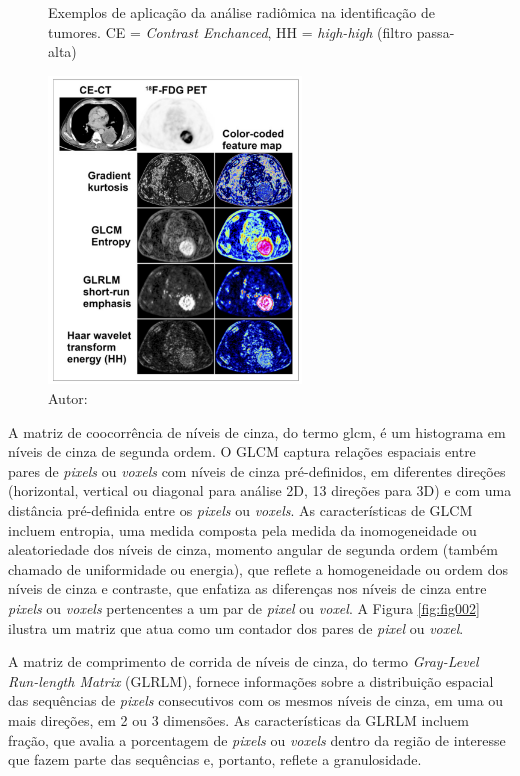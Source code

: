 \begin{figure}[htbp]
    \centering
    \captionsetup{width=0.98\textwidth, justification=justified}
    \caption{Exemplos de aplicação da análise radiômica na identificação de tumores. 
    \newline CE = \textit{Contrast Enchanced}, HH = \textit{high-high} (filtro passa-alta)}
    \includegraphics[width=0.6\textwidth]{figures/fig001.png}
    \caption*{Autor: \cite{mayerhoeferIntroductionRadiomics2020}}
    \label{fig:fig001}
\end{figure}

 A matriz de coocorrência de níveis de cinza, do termo \gls{glcm}, é um histograma em níveis de cinza de segunda ordem. O GLCM captura relações espaciais entre pares de \textit{pixels} ou \textit{voxels} com níveis de cinza pré-definidos, em diferentes direções (horizontal, vertical ou diagonal para análise 2D, 13 direções para 3D) e com uma distância pré-definida entre os \textit{pixels} ou \textit{voxels}. As características de GLCM incluem entropia, uma medida composta pela medida da inomogeneidade ou aleatoriedade dos níveis de cinza, momento angular de segunda ordem (também chamado de uniformidade ou energia), que reflete a homogeneidade ou ordem dos níveis de cinza e contraste, que enfatiza as diferenças nos níveis de cinza entre \textit{pixels} ou \textit{voxels} pertencentes a um par de \textit{pixel} ou \textit{voxel}. A Figura \ref{fig:fig002} ilustra um matriz que atua como um contador dos pares de \textit{pixel} ou \textit{voxel}.

 A matriz de comprimento de corrida de níveis de cinza, do termo 
 \textit{Gray-Level Run-length Matrix} (GLRLM), fornece informações sobre a distribuição espacial das sequências de \textit{pixels} consecutivos com os mesmos níveis de cinza, em uma ou mais direções, em 2 ou 3 dimensões. As características da GLRLM incluem fração, que avalia a porcentagem de \textit{pixels} ou \textit{voxels} dentro da região de interesse que fazem parte das sequências e, portanto, reflete a granulosidade. 

